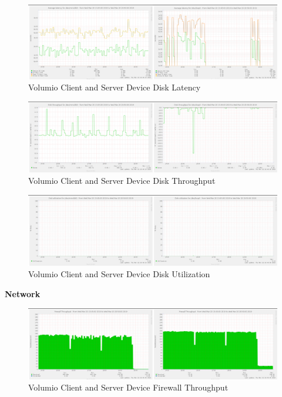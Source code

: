 \documentclass[11pt,a4paper]{scrreprt}
\begin{document}
\begin{figure}[H]
\includegraphics{ResultsAndAnalysis/VolumioServerTestImages/006VolumioDiskLatency.png}
\centering
\caption{Volumio Client and Server Device Disk Latency}
\label{VolumioDiskLatency}
\end{figure}

\begin{figure}[H]
\includegraphics{ResultsAndAnalysis/VolumioServerTestImages/007VolumioDiskThroughput.png}
\centering
\caption{Volumio Client and Server Device Disk Throughput}
\label{VolumioDiskThroughput}
\end{figure}

\begin{figure}[H]
\includegraphics{ResultsAndAnalysis/VolumioServerTestImages/009VolumioDiskUtilization.png}
\centering
\caption{Volumio Client and Server Device Disk Utilization}
\label{VolumioDiskUtil}
\end{figure}

\textbf{Network}

\begin{figure}[H]
\includegraphics{ResultsAndAnalysis/VolumioServerTestImages/012VolumioFirewallThroughput.png}
\centering
\caption{Volumio Client and Server Device Firewall Throughput}
\label{VolumioFirewallThroughput}
\end{figure}
\end{document}
